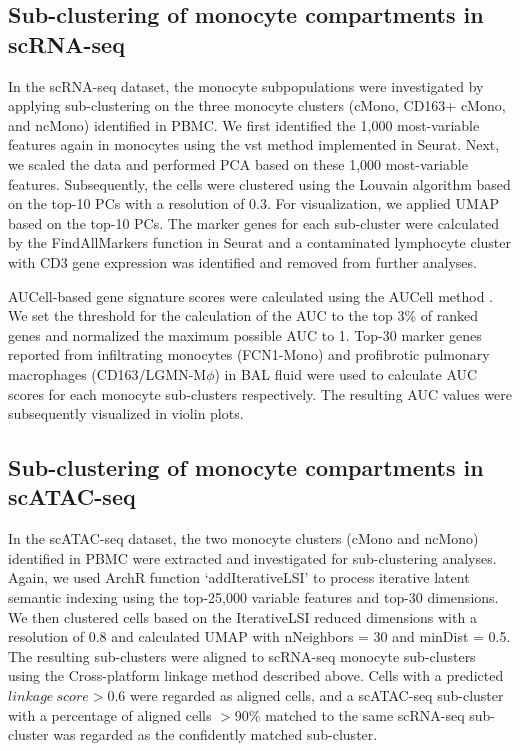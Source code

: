 \documentclass{book}
\begin{document}
\begin{refsection}
\subsection*{Sub-clustering of monocyte compartments in scRNA-seq}
In the scRNA-seq dataset, the monocyte subpopulations were investigated by applying sub-clustering on the three monocyte clusters (cMono, CD163+ cMono, and ncMono) identified in PBMC.
We first identified the 1,000 most-variable features again in monocytes using the vst method implemented in Seurat.
Next, we scaled the data and performed PCA based on these 1,000 most-variable features.
Subsequently, the cells were clustered using the Louvain algorithm based on the top-10 PCs with a resolution of 0.3.
For visualization, we applied UMAP based on the top-10 PCs.
The marker genes for each sub-cluster were calculated by the FindAllMarkers function in Seurat and a contaminated lymphocyte cluster with CD3 gene expression was identified and removed from further analyses.

AUCell-based gene signature scores were calculated using the AUCell method \cite{Aibar2017SCENIC}.
We set the threshold for the calculation of the AUC to the top 3\% of ranked genes and normalized the maximum possible AUC to 1.
Top-30 marker genes reported from infiltrating monocytes (FCN1-Mono) and profibrotic pulmonary macrophages (CD163/LGMN-M$\phi$) in BAL fluid \cite{Wendisch2021SARS} were used to calculate AUC scores for each monocyte sub-clusters respectively.
The resulting AUC values were subsequently visualized in violin plots.

\subsection*{Sub-clustering of monocyte compartments in scATAC-seq}
In the scATAC-seq dataset, the two monocyte clusters (cMono and ncMono) identified in PBMC were extracted and investigated for sub-clustering analyses.
Again, we used ArchR function ‘addIterativeLSI’ to process iterative latent semantic indexing using the top-25,000 variable features and top-30 dimensions.
We then clustered cells based on the IterativeLSI reduced dimensions with a resolution of 0.8 and calculated UMAP with nNeighbors = 30 and minDist = 0.5.
The resulting sub-clusters were aligned to scRNA-seq monocyte sub-clusters using the Cross-platform linkage method described above.
Cells with a predicted $linkage~score > 0.6$ were regarded as aligned cells, and a scATAC-seq sub-cluster with a percentage of aligned cells $>$90\% matched to the same scRNA-seq sub-cluster was regarded as the confidently matched sub-cluster.


\end{refsection}
\end{document}
